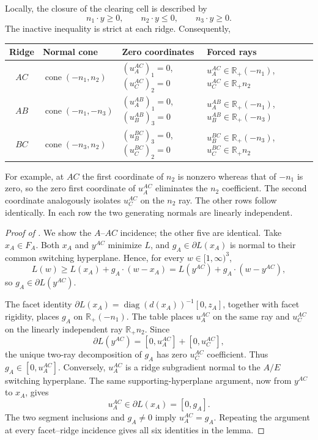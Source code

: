 \documentclass[11pt,a4paper,fleqn]{article}
\theoremstyle{plain}
\theoremstyle{definition}
\newcommand{\R}{\mathbb{R}}
\newcommand{\diag}{\operatorname{diag}}
\begin{document}
Locally, the closure of the clearing cell is described by
\[
n_1\cdot y\ge0,\qquad n_2\cdot y\le0,\qquad n_3\cdot y\ge0.
\]
The inactive inequality is strict at each ridge. Consequently,
\begin{center}
\small
\begin{tabular}{@{}clll@{}}
\toprule
Ridge & Normal cone & Zero coordinates & Forced rays\\
\midrule
$AC$ & $\operatorname{cone}(-n_1,n_2)$
& $(u_A^{AC})_1=0$, $(u_C^{AC})_2=0$
& $u_A^{AC}\in\R_+(-n_1)$, $u_C^{AC}\in\R_+n_2$\\
$AB$ & $\operatorname{cone}(-n_1,-n_3)$
& $(u_A^{AB})_1=0$, $(u_B^{AB})_3=0$
& $u_A^{AB}\in\R_+(-n_1)$, $u_B^{AB}\in\R_+(-n_3)$\\
$BC$ & $\operatorname{cone}(-n_3,n_2)$
& $(u_B^{BC})_3=0$, $(u_C^{BC})_2=0$
& $u_B^{BC}\in\R_+(-n_3)$, $u_C^{BC}\in\R_+n_2$\\
\bottomrule
\end{tabular}
\end{center}
For example, at $AC$ the first coordinate of $n_2$ is nonzero whereas that of $-n_1$ is zero, so the zero first coordinate of $u_A^{AC}$ eliminates the $n_2$ coefficient. The second coordinate analogously isolates $u_C^{AC}$ on the $n_2$ ray. The other rows follow identically. In each row the two generating normals are linearly independent.

\begin{proof}[Proof of ]
We show the $A$--$AC$ incidence; the other five are identical. Take $x_A\in F_A$. Both $x_A$ and $y^{AC}$ minimize $L$, and $g_A\in\partial L(x_A)$ is normal to their common switching hyperplane. Hence, for every $w\in[1,\infty)^3$,
\[
L(w)\ge L(x_A)+g_A\cdot(w-x_A)
     =L(y^{AC})+g_A\cdot(w-y^{AC}),
\]
so $g_A\in\partial L(y^{AC})$.

The facet identity $\partial L(x_A)=\diag(d(x_A))^{-1}[0,z_A]$, together with facet rigidity, places $g_A$ on $\R_+(-n_1)$. The table places $u_A^{AC}$ on the same ray and $u_C^{AC}$ on the linearly independent ray $\R_+n_2$. Since
\[
\partial L(y^{AC})=[0,u_A^{AC}]+[0,u_C^{AC}],
\]
the unique two-ray decomposition of $g_A$ has zero $u_C^{AC}$ coefficient. Thus $g_A\in[0,u_A^{AC}]$. Conversely, $u_A^{AC}$ is a ridge subgradient normal to the $A/E$ switching hyperplane. The same supporting-hyperplane argument, now from $y^{AC}$ to $x_A$, gives
\[
u_A^{AC}\in\partial L(x_A)=[0,g_A].
\]
The two segment inclusions and $g_A\ne0$ imply $u_A^{AC}=g_A$. Repeating the argument at every facet--ridge incidence gives all six identities in the lemma.
\end{proof}
\end{document}
